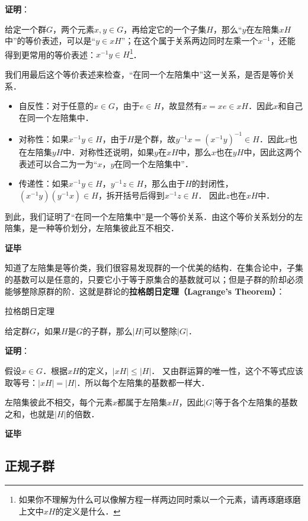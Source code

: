 \textbf{证明}：

给定一个群$G$，两个元素$x, y\in G$，再给定它的一个子集$H$，那么“$y$在左陪集$xH$中”的等价表述，可以是“$y\in xH$”；在这个属于关系两边同时左乘一个$x^{-1}$，还能得到更常用的等价表述：$x^{-1}y\in H$\footnote{如果你不理解为什么可以像解方程一样两边同时乘以一个元素，请再琢磨琢磨上文中$xH$的定义是什么．}．

我们用最后这个等价表述来检查，“在同一个左陪集中”这一关系，是否是等价关系．
\begin{itemize}
\item 自反性：对于任意的$x\in G$，由于$e\in H$，故显然有$x=xe\in xH$．因此$x$和自己在同一个左陪集中．
\item 对称性：如果$x^{-1}y\in H$，由于$H$是个群，故$y^{-1}x=(x^{-1}y)^{-1}\in H$．因此$x$也在左陪集$yH$中．对称性还说明，如果$y$在$xH$中，那么$x$也在$yH$中，因此这两个表述可以合二为一为“$x$，$y$在同一个左陪集中”．
\item 传递性：如果$x^{-1}y\in H$，$y^{-1}z\in H$，那么由于$H$的封闭性，$(x^{-1}y)(y^{-1}x)\in H$，拆开括号后得到$x^{-1}z\in H$． 因此$z$也在$xH$中．
\end{itemize}

到此，我们证明了“在同一个左陪集中”是一个等价关系．由这个等价关系划分的左陪集，是一种等价划分，左陪集彼此互不相交．

\textbf{证毕}

知道了左陪集是等价类，我们很容易发现群的一个优美的结构．在集合论中，子集的基数可以是任意的，只要它小于等于原集合的基数就可以；但是子群的阶却必须能够整除原群的阶．这就是群论的\textbf{拉格朗日定理（Lagrange's Theorem）}：

\begin{theorem}{拉格朗日定理}\label{Group1_the2}

给定群$G$，如果$H$是$G$的子群，那么$|H|$可以整除$|G|$．

\end{theorem}

\textbf{证明}：

假设$x\in G$．根据$xH$的定义，$|xH|\leq|H|$． 又由群运算的唯一性，这个不等式应该取等号：$|xH|=|H|$．所以每个左陪集的基数都一样大．

左陪集彼此不相交，每个元素$x$都属于左陪集$xH$，因此$|G|$等于各个左陪集的基数之和，也就是$|H|$的倍数．

\textbf{证毕}

\subsection{正规子群}

